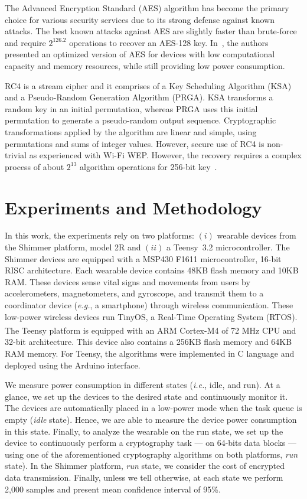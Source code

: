 \documentclass[journal]{IEEEtran}
\begin{document}
The Advanced Encryption Standard (AES) algorithm has become the primary choice for various security services due to its strong defense against known attacks. The best known attacks against AES are slightly faster than brute-force and require $2^{126.2}$ operations to recover an AES-128 key. In~\cite{nasser2016aes}, the authors presented an optimized version of AES for devices with low computational capacity and memory resources, while still providing low power consumption. 

RC4 is a stream cipher and it comprises of a Key Scheduling Algorithm (KSA) and a Pseudo-Random Generation Algorithm (PRGA). KSA transforms a random key in an initial permutation, whereas PRGA uses this initial permutation to generate a pseudo-random output sequence. Cryptographic transformations applied by the algorithm are linear and simple, using permutations and sums of integer values. However, secure use of RC4 is non-trivial as experienced with Wi-Fi WEP. However, the recovery requires a complex process of about $2^{13}$ algorithm operations for 256-bit key~\cite{son2019fast}.

\vspace{-0.25cm}
\section{Experiments and Methodology}
\label{sec:Methodology}

 In this work, the experiments rely on two platforms: $(i)$ wearable devices from the Shimmer platform, model 2R and $(ii)$ a Teensy\texttrademark~3.2 microcontroller. The Shimmer devices are equipped with a MSP430 F1611 microcontroller, 16-bit RISC architecture. Each wearable device contains 48KB flash memory and 10KB RAM. These devices sense vital signs and movements from users by accelerometers, magnetometers, and gyroscope, and transmit them to a coordinator device ({\em e.g.}, a smartphone) through wireless communication. These low-power wireless devices run TinyOS, a Real-Time Operating System (RTOS). The Teensy platform is equipped with an ARM\textsuperscript{\textregistered} Cortex\textsuperscript{\textregistered}-M4 of 72 MHz CPU and 32-bit architecture. This device also contains a 256KB flash memory and 64KB RAM memory. For Teensy, the algorithms were implemented in C language and deployed using the Arduino interface.

 We measure power consumption in different states ({\em i.e.}, idle, and run). At a glance, we set up the devices to the desired state and continuously monitor it. The devices are automatically placed in a low-power mode when the task queue is empty (\textit{idle} state). Hence, we are able to measure the device power consumption in this state. Finally, to analyze the wearable on the run state, we set up the device to continuously perform a cryptography task --- on 64-bits data blocks --- using one of the aforementioned cryptography algorithms on both platforms, {\em run} state). In the Shimmer platform, {\em run} state, we consider the cost of encrypted data transmission. Finally, unless we tell otherwise, at each state we perform 2,000 samples and present mean confidence interval of 95\%.
\end{document}
